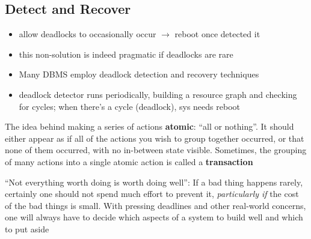 \documentclass[8pt,a4paper,landscape]{extarticle}
\begin{document}
\begin{multicols*}{3}
\section*{Detect and Recover}
\begin{itemize}
\item allow deadlocks to occasionally occur $\to$ reboot once detected it
\item this non-solution is indeed pragmatic if deadlocks are rare
\item Many DBMS employ deadlock detection and recovery techniques
\item deadlock detector runs periodically, building a resource graph and checking for cycles; when there's a cycle (deadlock), sys needs reboot
\end{itemize}
\begin{tcolorbox}[left=0mm, top=1mm, right=0mm, rightlower=0mm, bottom=1mm,
  title=USE ATOMIC OPERATIONS,
  halign title=center]
  The idea behind making a series of actions \textbf{atomic}: ``all or nothing''. It should either appear as if all of the actions you wish to group together occurred, or that none of them occurred, with no in-between state visible. Sometimes, the grouping of many actions into a single atomic action is called a \textbf{transaction}
\end{tcolorbox}
\begin{tcolorbox}[left=0mm, top=1mm, right=0mm, rightlower=0mm, bottom=1mm,
  title= DON'T ALWAYS DO IT PERFECTLY (TOM WEST'S LAW),
  halign title=center]
  ``Not everything worth doing is worth doing well'': If a bad thing happens rarely, certainly one should not spend much effort to prevent it, \emph{particularly if} the cost of the bad things is small. With pressing deadlines and other real-world concerns, one will always have to decide which aspects of a system to build well and which to put aside
\end{tcolorbox}

\end{multicols*}
\end{document}

